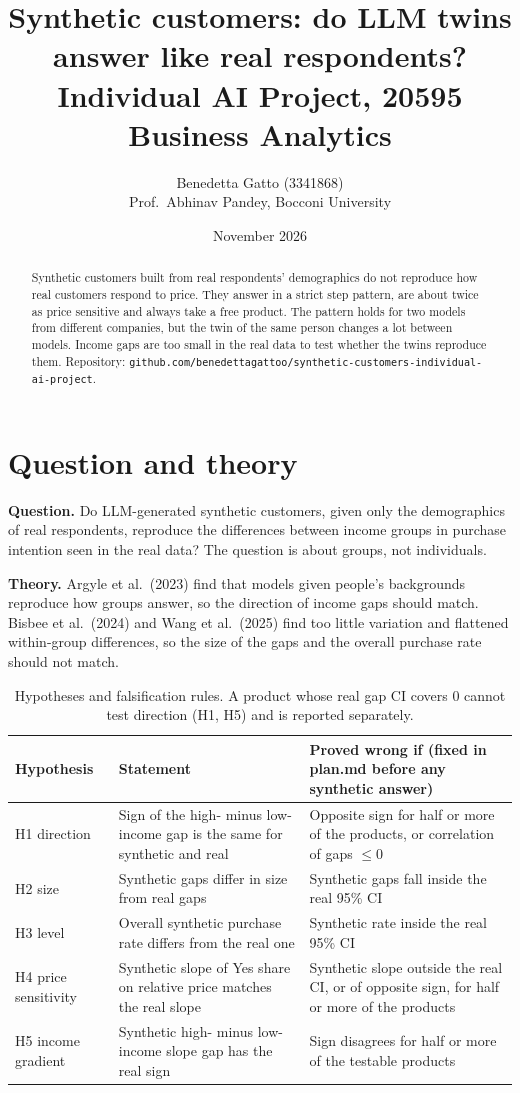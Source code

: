 \documentclass[11pt,a4paper]{article}
\title{\textbf{Synthetic customers: do LLM twins answer like real respondents?}\\[0.4em]
\large Individual AI Project, 20595 Business Analytics}
\author{Benedetta Gatto (3341868)\\Prof.\ Abhinav Pandey, Bocconi University}
\date{November 2026}
\begin{document}
\maketitle

\begin{abstract}
\noindent Synthetic customers built from real respondents' demographics do not reproduce how real customers respond to price. They answer in a strict step pattern, are about twice as price sensitive and always take a free product. The pattern holds for two models from different companies, but the twin of the same person changes a lot between models. Income gaps are too small in the real data to test whether the twins reproduce them. Repository: \texttt{github.com/benedettagattoo/synthetic-customers-individual-ai-project}.
\end{abstract}

\section{Question and theory}

\textbf{Question.} Do LLM-generated synthetic customers, given only the demographics of real respondents, reproduce the differences between income groups in purchase intention seen in the real data? The question is about groups, not individuals.

\textbf{Theory.} Argyle et al.\ (2023) find that models given people's backgrounds reproduce how groups answer, so the direction of income gaps should match. Bisbee et al.\ (2024) and Wang et al.\ (2025) find too little variation and flattened within-group differences, so the size of the gaps and the overall purchase rate should not match.

\begin{table}[H]
\centering\small
\begin{tabularx}{\linewidth}{lLL}
\toprule
\textbf{Hypothesis} & \textbf{Statement} & \textbf{Proved wrong if (fixed in plan.md before any synthetic answer)}\\
\midrule
H1 direction & Sign of the high- minus low-income gap is the same for synthetic and real & Opposite sign for half or more of the products, or correlation of gaps $\le 0$\\
H2 size & Synthetic gaps differ in size from real gaps & Synthetic gaps fall inside the real 95\% CI\\
H3 level & Overall synthetic purchase rate differs from the real one & Synthetic rate inside the real 95\% CI\\
H4 price sensitivity & Synthetic slope of Yes share on relative price matches the real slope & Synthetic slope outside the real CI, or of opposite sign, for half or more of the products\\
H5 income gradient & Synthetic high- minus low-income slope gap has the real sign & Sign disagrees for half or more of the testable products\\
\bottomrule
\end{tabularx}
\caption{Hypotheses and falsification rules. A product whose real gap CI covers 0 cannot test direction (H1, H5) and is reported separately.}
\end{table}
\end{document}
